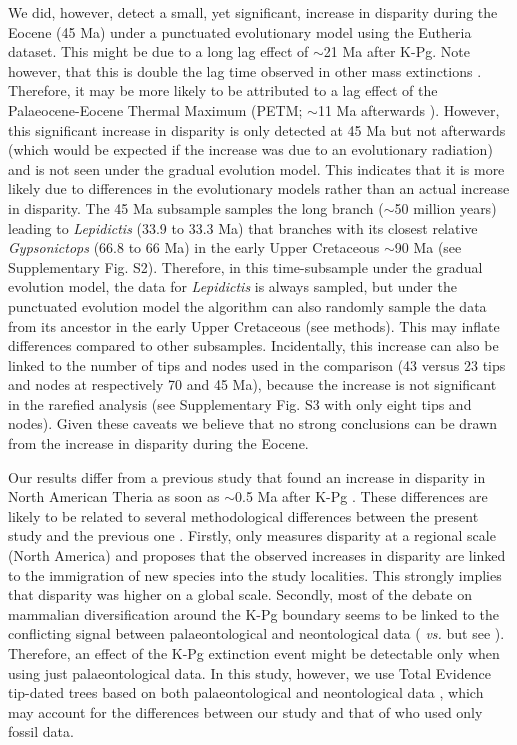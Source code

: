 \documentclass[12pt,letterpaper]{article}
\begin{document}
We did, however, detect a small, yet significant, increase in disparity during the Eocene (45 Ma) under a punctuated evolutionary model using the Eutheria dataset.
This might be due to a long lag effect of $\sim$21 Ma after K-Pg.
Note however, that this is double the lag time observed in other mass extinctions \cite{chen2012timing}.
Therefore, it may be more likely to be attributed to a lag effect of the Palaeocene-Eocene Thermal Maximum (PETM; $\sim$11 Ma afterwards \cite{bininda2007delayed}).
However, this significant increase in disparity is only detected at 45 Ma but not afterwards (which would be expected if the increase was due to an evolutionary radiation) and is not seen under the gradual evolution model.
This indicates that it is more likely due to differences in the evolutionary models rather than an actual increase in disparity.
The 45 Ma subsample samples the long branch ($\sim$50 million years) leading to \textit{Lepidictis} (33.9 to 33.3 Ma) that branches with its closest relative \textit{Gypsonictops} (66.8 to 66 Ma) in the early Upper Cretaceous $\sim$90 Ma (see Supplementary Fig. S2).
Therefore, in this time-subsample under the gradual evolution model, the data for \textit{Lepidictis} is always sampled, but under the punctuated evolution model the algorithm can also randomly sample the data from its ancestor in the early Upper Cretaceous (see methods).
This may inflate differences compared to other subsamples.
Incidentally, this increase can also be linked to the number of tips and nodes used in the comparison (43 versus 23 tips and nodes at respectively 70 and 45 Ma), because the increase is not significant in the rarefied analysis (see Supplementary Fig. S3 with only eight tips and nodes).
Given these caveats we believe that no strong conclusions can be drawn from the increase in disparity during the Eocene.

Our results differ from a previous study that found an increase in disparity in North American Theria as soon as $\sim$0.5 Ma after K-Pg \cite{Wilson2013}.
These differences are likely to be related to several methodological differences between the present study and the previous one \cite{Wilson2013}.
Firstly, \cite{Wilson2013} only measures disparity at a regional scale (North America) and proposes that the observed increases in disparity are linked to the immigration of new species into the study localities.
This strongly implies that disparity was higher on a global scale.
Secondly, most of the debate on mammalian diversification around the K-Pg boundary seems to be linked to the conflicting signal between palaeontological and neontological data (\cite{meredithimpacts2011} \textit{vs.} \cite{OLeary08022013} but see \cite{dosReis2014}).
Therefore, an effect of the K-Pg extinction event might be detectable only when using just palaeontological data.
In this study, however, we use Total Evidence tip-dated trees based on both palaeontological and neontological data \cite{Slater2012MEE,beckancient2014}, which may account for the differences between our study and that of \cite{Wilson2013} who used only fossil data.
\end{document}
